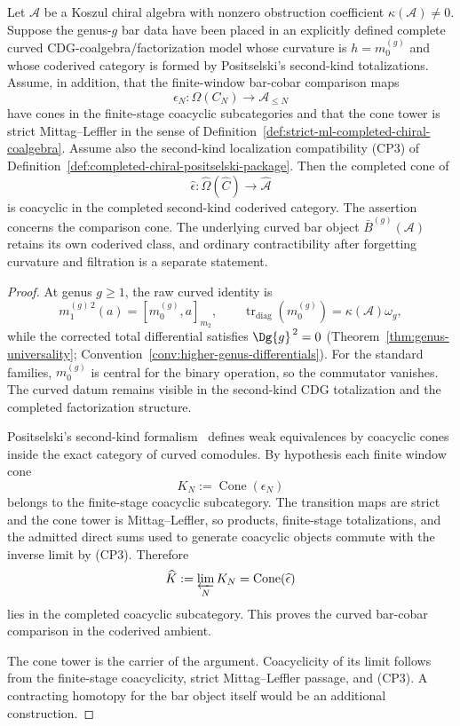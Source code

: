 \begin{proposition}
\label{prop:curved-bar-acyclicity}
Let $\mathcal{A}$ be a Koszul chiral algebra with nonzero obstruction
coefficient $\kappa(\mathcal{A}) \neq 0$. Suppose the genus-$g$ bar
data have been placed in an explicitly defined complete curved
CDG-coalgebra/factorization model whose curvature is
$h=m_0^{(g)}$ and whose coderived category is formed by Positselski's
second-kind totalizations. Assume, in addition, that the finite-window
bar-cobar comparison maps
\[
\epsilon_N\colon \Omega(C_N)\longrightarrow \mathcal{A}_{\leq N}
\]
have cones in the finite-stage coacyclic subcategories and that the
cone tower is strict Mittag--Leffler in the sense of
Definition~\ref{def:strict-ml-completed-chiral-coalgebra}.  Assume
also the second-kind localization compatibility
\textup{(CP3)} of
Definition~\ref{def:completed-chiral-positselski-package}. Then the
completed cone of
\[
\widehat\epsilon\colon
\widehat\Omega(\widehat C)\longrightarrow \widehat{\mathcal A}
\]
is coacyclic in the completed second-kind coderived category.
The assertion concerns the comparison cone.  The underlying curved
bar object \(\bar B^{(g)}(\mathcal A)\) retains its own coderived
class, and ordinary contractibility after forgetting curvature and
filtration is a separate statement.
\end{proposition}

\begin{proof}
At genus \(g\geq1\), the raw curved identity is
\[
 m_1^{(g)\,2}(a)=[m_0^{(g)},a]_{m_2},
 \qquad
 \operatorname{tr}_{\mathrm{diag}}(m_0^{(g)})
 =\kappa(\mathcal A)\omega_g ,
\]
while the corrected total differential satisfies
\(\Dg{g}^{\,2}=0\)
(Theorem~\ref{thm:genus-universality};
Convention~\ref{conv:higher-genus-differentials}).  For the standard
families, \(m_0^{(g)}\) is central for the binary operation, so the
commutator vanishes.  The curved datum remains visible in the
second-kind CDG totalization and the completed factorization
structure.

Positselski's second-kind formalism~\cite[\S\S3--4]{Positselski11}
defines weak equivalences by coacyclic cones inside the exact
category of curved comodules. By hypothesis each finite window cone
\[
K_N:=\operatorname{Cone}(\epsilon_N)
\]
belongs to the finite-stage coacyclic subcategory. The transition maps
are strict and the cone tower is Mittag--Leffler, so products,
finite-stage totalizations, and the admitted direct sums used to
generate coacyclic objects commute with the inverse limit by
\textup{(CP3)}. Therefore
\[
\widehat K:=\varprojlim_N K_N
=\operatorname{Cone}(\widehat\epsilon)
\]
lies in the completed coacyclic subcategory. This proves the curved
bar-cobar comparison in the coderived ambient.

The cone tower is the carrier of the argument.  Coacyclicity of its
limit follows from the finite-stage coacyclicity, strict
Mittag--Leffler passage, and \textup{(CP3)}.  A contracting homotopy
for the bar object itself would be an additional construction.
\end{proof}

